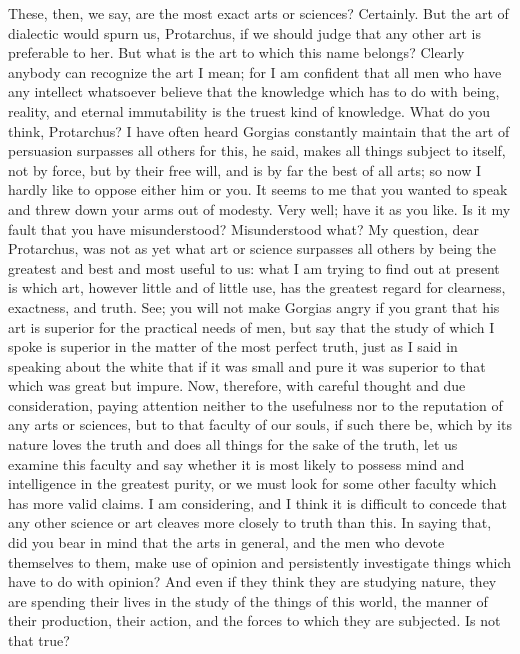 \documentclass[letterpaper,12pt]{article}
\newcommand{\stephpag}[1]{\marginnote{\small\itshape\fontfamily{ppl}\selectfont #1}}
\begin{document}
\begin{drama}
\socratesspeaks
These, then, we say, are the most exact arts or sciences?
\protarchusspeaks
Certainly.
\socratesspeaks
But the art of dialectic would spurn us, Protarchus, if we should judge that any other art is preferable to her. \stephpag{58 a}
\protarchusspeaks
But what is the art to which this name belongs?
\socratesspeaks
Clearly anybody can recognize the art I mean; for I am confident that all men who have any intellect whatsoever believe that the knowledge which has to do with being, reality, and eternal immutability is the truest kind of knowledge. What do you think, Protarchus?
\protarchusspeaks
I have often heard Gorgias constantly maintain that the art of persuasion surpasses all others for this, he said, makes all things subject to itself, \stephpag{b} not by force, but by their free will, and is by far the best of all arts; so now I hardly like to oppose either him or you.
\socratesspeaks
It seems to me that you wanted to speak and threw down your arms out of modesty.
\protarchusspeaks
Very well; have it as you like.
\socratesspeaks
Is it my fault that you have misunderstood?
\protarchusspeaks
Misunderstood what?
\socratesspeaks
My question, dear Protarchus, was not as yet what art or science surpasses all others \stephpag{c} by being the greatest and best and most useful to us: what I am trying to find out at present is which art, however little and of little use, has the greatest regard for clearness, exactness, and truth. See; you will not make Gorgias angry if you grant that his art is superior for the practical needs of men, but say that the study of which I spoke is superior in the matter of the most perfect truth, just as I said in speaking about the white that if it was small and pure it was superior to that which was great \stephpag{d} but impure. Now, therefore, with careful thought and due consideration, paying attention neither to the usefulness nor to the reputation of any arts or sciences, but to that faculty of our souls, if such there be, which by its nature loves the truth and does all things for the sake of the truth, let us examine this faculty and say whether it is most likely to possess mind and intelligence in the greatest purity, or we must look for some other faculty \stephpag{e} which has more valid claims.
\protarchusspeaks
I am considering, and I think it is difficult to concede that any other science or art cleaves more closely to truth than this.
\socratesspeaks
In saying that, did you bear in mind that the arts in general, and the men who devote themselves to them, \stephpag{59 a} make use of opinion and persistently investigate things which have to do with opinion? And even if they think they are studying nature, they are spending their lives in the study of the things of this world, the manner of their production, their action, and the forces to which they are subjected. Is not that true?

\end{drama}
\end{document}
